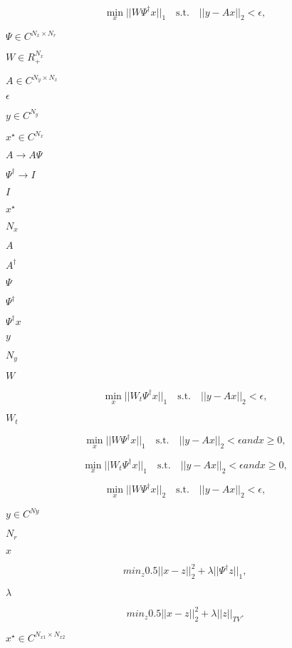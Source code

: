 \documentclass{article}
\begin{document}
\[ \min_{x} ||W \Psi^\dagger x||_1 \quad \mbox{s.t.} \quad ||y - A x||_2 < \epsilon, \]
\pagebreak

$ \Psi \in C^{N_x \times N_r} $
\pagebreak

$ W \in R_{+}^{N_x}$
\pagebreak

$A \in C^{N_y \times N_x}$
\pagebreak

$\epsilon$
\pagebreak

$y\in C^{N_y}$
\pagebreak

$x^\star \in C^{N_x}$
\pagebreak

$A \rightarrow A \Psi$
\pagebreak

$\Psi^\dagger \rightarrow I$
\pagebreak

$I $
\pagebreak

$ x^\star $
\pagebreak

$N_x$
\pagebreak

$A$
\pagebreak

$A^\dagger$
\pagebreak

$\Psi$
\pagebreak

$\Psi^\dagger$
\pagebreak

$\Psi^\dagger x$
\pagebreak

$y$
\pagebreak

$N_y$
\pagebreak

$ W $
\pagebreak

\[ \min_{x} ||W_t \Psi^\dagger x||_1 \quad \mbox{s.t.} \quad ||y - A x||_2 < \epsilon, \]
\pagebreak

$ W_t $
\pagebreak

\[ \min_{x} ||W \Psi^\dagger x||_1 \quad \mbox{s.t.} \quad ||y - A x||_2 < \epsilon and x \geq 0, \]
\pagebreak

\[ \min_{x} ||W_t \Psi^\dagger x||_1 \quad \mbox{s.t.} \quad ||y - A x||_2 < \epsilon and x \geq 0, \]
\pagebreak

\[ \min_{x} ||W \Psi^\dagger x||_2 \quad \mbox{s.t.} \quad ||y - A x||_2 < \epsilon, \]
\pagebreak

$y\in C^{Ny}$
\pagebreak

$N_r$
\pagebreak

$ x $
\pagebreak

\[ min_{z} 0.5||x - z||_2^2 + \lambda ||\Psi^\dagger z||_1, \]
\pagebreak

$\lambda$
\pagebreak

\[ min_{z} 0.5||x - z||_2^2 + \lambda||z||_{TV}. \]
\pagebreak

$x^\star \in C^{N_{x1}\times N_{x2}}$
\pagebreak
\end{document}
